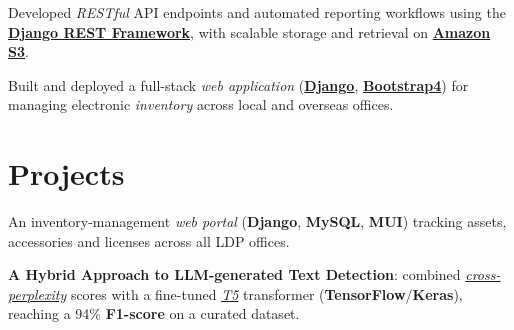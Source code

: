 \documentclass[]{openfont}
\begin{document}
\begin{minipage}[t]{0.65\textwidth}
    \begin{tightemize}
        \item Developed \textit{RESTful} API endpoints and automated reporting workflows using the \textbf{\href{https://www.django-rest-framework.org/}{Django REST Framework}}, with scalable storage and retrieval on \href{https://aws.amazon.com/s3/}{\textbf{Amazon S3}}.
    \end{tightemize}
    \sectionsep

    \begin{tightemize}
        \item Built and deployed a full-stack \textit{web application} (\href{https://www.djangoproject.com/}{\textbf{Django}}, \href{https://getbootstrap.com/}{\textbf{Bootstrap4}}) for managing electronic \textit{inventory} across local and overseas offices.
    \end{tightemize}
    \sectionsep


    \section{Projects}
    \begin{tightemize}
        \item An inventory-management \textit{web portal} (\textbf{Django}, \textbf{MySQL}, \textbf{MUI}) tracking assets, accessories and licenses across all LDP offices.
    \end{tightemize}
    \sectionsep

    \begin{tightemize}
        \item \textbf{A Hybrid Approach to LLM-generated Text Detection}: combined \href{https://huggingface.co/spaces/evaluate-metric/perplexity}{\textit{cross-perplexity}} scores with a fine-tuned \href{https://en.wikipedia.org/wiki/T5_(language_model)}{\textit{T5}} transformer (\textbf{TensorFlow}/\textbf{Keras}), reaching a 94\% \textbf{F1-score} on a curated dataset.
    \end{tightemize}
    \sectionsep

\end{minipage}
\end{document}
